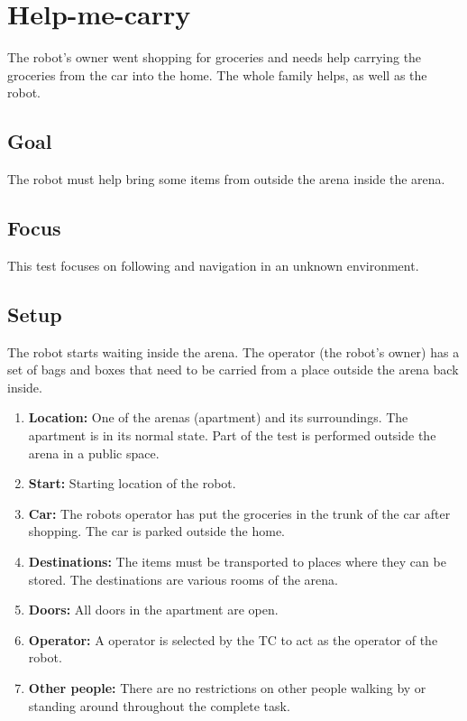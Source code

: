 \section{Help-me-carry}
The robot's owner went shopping for groceries and needs help carrying the groceries from the car into the home.
The whole family helps, as well as the robot. 

\subsection{Goal}
The robot must help bring some items from outside the arena inside the arena.

\subsection{Focus}
This test focuses on following and navigation in an unknown environment. 

\subsection{Setup}
The robot starts waiting inside the arena. 
The operator (the robot's owner) has a set of bags and boxes that need to be carried from a place outside the arena back inside. 

\begin{enumerate}
  \item \textbf{Location:} One of the arenas (apartment) and its surroundings. The apartment is in its normal state. Part of the test is performed outside the arena in a public space.
  \item \textbf{Start:} Starting location of the robot. %
  \item \textbf{Car:} The robots operator has put the groceries in the trunk of the car after shopping. The car is parked outside the home.
  \item \textbf{Destinations:} The items must be transported to places where they can be stored. The destinations are various rooms of the arena. 
  \item \textbf{Doors:} All doors in the apartment are open.
  \item \textbf{Operator:} A  operator is selected by the TC to act as the operator of the robot. 
  \item \textbf{Other people:} There are no restrictions on other people walking by or standing around throughout the complete task. 
\end{enumerate}

